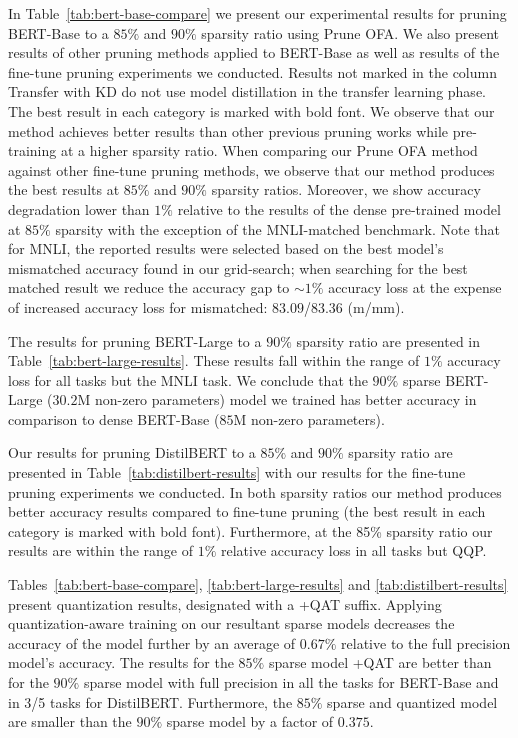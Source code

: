 \documentclass{article}
\begin{document}
In Table~\ref{tab:bert-base-compare} we present our experimental results for pruning BERT-Base to a $85\%$ and $90\%$ sparsity ratio using Prune OFA.
We also present results of other pruning methods applied to BERT-Base as well as results of the fine-tune pruning experiments we conducted.
Results not marked in the column Transfer with KD do not use model distillation in the transfer learning phase.
The best result in each category is marked with bold font.
We observe that our method achieves better results than other previous pruning works while pre-training at a higher sparsity ratio.
When comparing our Prune OFA method against other fine-tune pruning methods, we observe that our method produces the best results at $85\%$ and $90\%$ sparsity ratios.
Moreover, we show accuracy degradation lower than $1\%$ relative to the results of the dense pre-trained model at $85\%$ sparsity with the exception of the MNLI-matched benchmark.
Note that for MNLI, the reported results were selected based on the best model's mismatched accuracy found in our grid-search; when searching for the best matched result we reduce the accuracy gap to $\sim 1\%$ accuracy loss at the expense of increased accuracy loss for mismatched: $83.09$/$83.36$ (m/mm).

The results for pruning BERT-Large to a $90\%$ sparsity ratio are presented in Table~\ref{tab:bert-large-results}.
These results fall within the range of $1\%$ accuracy loss for all tasks but the MNLI task.
We conclude that the $90\%$ sparse BERT-Large ($30.2$M non-zero parameters) model we trained has better accuracy in comparison to dense BERT-Base ($85$M non-zero parameters).

Our results for pruning DistilBERT to a $85\%$ and $90\%$ sparsity ratio are presented in Table~\ref{tab:distilbert-results} with our results for the fine-tune pruning experiments we conducted.
In both sparsity ratios our method produces better accuracy results compared to fine-tune pruning (the best result in each category is marked with bold font).
Furthermore, at the 85\% sparsity ratio our results are within the range of $1\%$ relative accuracy loss in all tasks but QQP.

Tables~\ref{tab:bert-base-compare}, \ref{tab:bert-large-results} and \ref{tab:distilbert-results} present quantization results, designated with a +QAT suffix.
Applying quantization-aware training on our resultant sparse models decreases the accuracy of the model further by an average of $0.67\%$ relative to the full precision model's accuracy.
The results for the $85\%$ sparse model +QAT are better than for the $90\%$ sparse model with full precision in all the tasks for BERT-Base and in 3/5 tasks for DistilBERT.
Furthermore, the $85\%$ sparse and quantized model are smaller than the $90\%$ sparse model by a factor of $0.375$.
\end{document}
